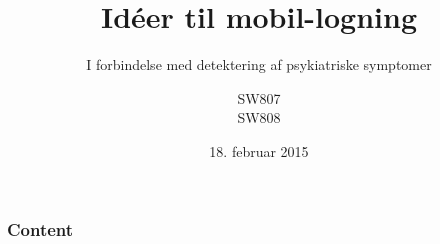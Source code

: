 \documentclass{beamer}
\title{Idéer til mobil-logning}
\subtitle{I forbindelse med detektering af psykiatriske symptomer}
\author{SW807 \\ SW808}
\institute[Aalborg University]
{
  Software\\
  Aalborg University}
\date{18. februar 2015}
\begin{document}

\begin{frame}
  \titlepage
\end{frame}



\begin{frame}
        \frametitle{Content}
        \tableofcontents
   \end{frame}


\end{document}
